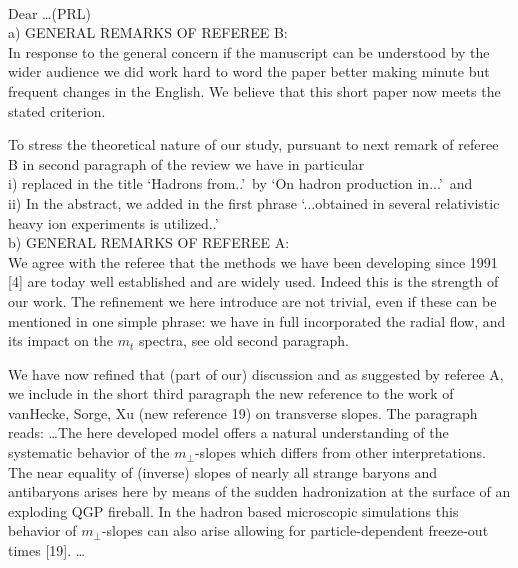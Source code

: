 \\[-0.7cm]
%
\begin{mdframed}[linecolor=gray,roundcorner=12pt,backgroundcolor=Dandelion!15,linewidth=1pt,leftmargin=0cm,rightmargin=0cm,topline=true,bottomline=true,skipabove=12pt]
 \relax%
%
Dear \ldots (PRL)\\


\noindent a) \small{GENERAL REMARKS OF REFEREE B:}\\
In response to the general concern if the manuscript can be understood by the wider audience we did work hard to word the paper better making minute but frequent changes in the English. We believe that this short paper now meets the stated criterion.

To stress the theoretical nature of our study, pursuant to next remark of referee B in second paragraph of the review we have in particular\\
 i) replaced in the title \lq Hadrons from..\rq\ by \lq On hadron production in...\rq\ and \\
 ii) In the abstract, we added in the first phrase \lq ...obtained in several relativistic heavy ion experiments is utilized..\rq\\

\noindent b) \small{GENERAL REMARKS OF REFEREE A:}\\
We agree with the referee that the methods we have been developing since 1991 [4] are today well established and are widely used. Indeed this is the strength of our work. The refinement we here introduce are not trivial, even if these can be mentioned in one simple phrase: we have in full incorporated the radial flow, and its impact on the $m_t$ spectra, see old second paragraph. 

We have now refined that (part of our) discussion and as suggested by referee A, we include in the short third paragraph the new reference to the work of vanHecke, Sorge, Xu (new reference 19) on transverse slopes. The paragraph reads: \ldots The here developed model offers a natural understanding of the systematic behavior of the $m_\bot$-slopes which differs from other interpretations. The near equality of (inverse) slopes of nearly all strange baryons and antibaryons arises here by means of the sudden hadronization at the surface of an exploding QGP fireball. In the hadron based microscopic simulations this behavior of $m_\bot$-slopes can also arise allowing for particle-dependent freeze-out times [19]. \ldots



\end{mdframed}
